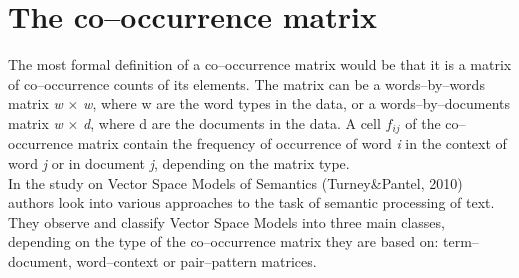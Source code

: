 

\section{The co--occurrence matrix} \label{coOcMatrix}
The most formal definition of a co--occurrence matrix would be that it is a matrix of co--occurrence counts of its elements. The matrix can be a words--by--words matrix \textit{w} $\times$ \textit{w}, where w are the word types in the data, or a words--by--documents matrix \textit{w} $\times$ \textit{d}, where d are the documents in the data. A cell $f_{ij}$ of the co--occurrence matrix contain the frequency of occurrence of word \textit{i} in the context of word \textit{j} or in document \textit{j}, depending on the matrix type.
\\In the study on Vector Space Models of Semantics (Turney\&Pantel, 2010) authors look into various approaches to the task of  semantic processing of text. They observe and classify Vector Space Models into three main classes, depending on the type of the co--occurrence matrix they are based on: term--document, word--context or pair--pattern matrices. 

